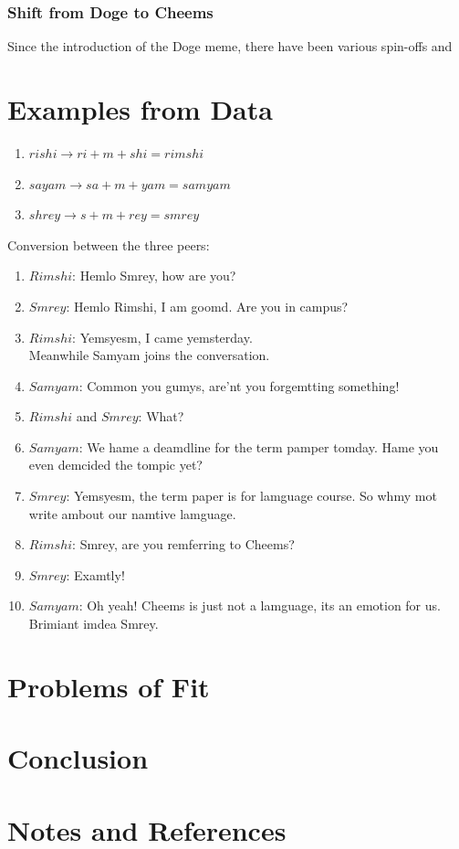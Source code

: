 \documentclass{article}
\begin{document}
\subsubsection{Shift from Doge to Cheems}
Since the introduction of the Doge meme, there have been various spin-offs and


\section{Examples from Data}
\begin{enumerate}
    \item $rishi \rightarrow ri+m+shi = rimshi$
    \item $sayam \rightarrow sa+m+yam = samyam$
    \item $shrey \rightarrow s+m+rey = smrey$
\end{enumerate}
Conversion between the three peers:
\begin{enumerate}
    \item $Rimshi$: Hemlo Smrey, how are you?
    \item $Smrey$: Hemlo Rimshi, I am goomd. Are you in campus?
    \item $Rimshi$: Yemsyesm, I came yemsterday.\\
    Meanwhile Samyam joins the conversation.
    \item $Samyam$: Common you gumys, are'nt you forgemtting something!
    \item $Rimshi$ and $Smrey$: What?
    \item $Samyam$: We hame a deamdline for the term pamper tomday. Hame you even demcided the tompic yet?
    \item $Smrey$: Yemsyesm, the term paper is for lamguage course. So whmy mot write ambout our namtive lamguage.
    \item $Rimshi$: Smrey, are you remferring to Cheems? 
    \item $Smrey$: Examtly!
    \item $Samyam$: Oh yeah! Cheems is just not a lamguage, its an emotion for us. Brimiant imdea Smrey.
\end{enumerate}

\section{Problems of Fit}

\section{Conclusion}

\section{Notes and References}
\end{document}
